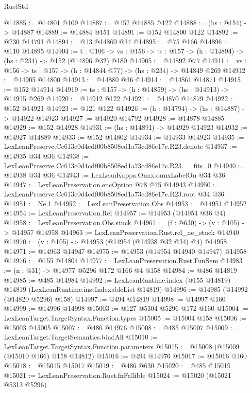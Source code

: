 \begin{lexlean}{RustStd}
\begin{coremodule}
@14885 := @14801 @109
@14887 := @152 @14885 @122
@14888 := (hs : @154) -> @14887
@14889 := @14884 @151
@14891 := @152 @14800 @122
@14892 := @230 @14791
@14894 := @13 @14860 @34
@14895 := @75 @166
@14896 := @110 @14895
@14904 := {t : @106} ->
  {vs : @156} -> {ts : @157} -> (h : @14894) -> (hs : @234) -> @152 (@14896 @32) @180
@14905 := @14892 @77
@14911 := {vs : @156} -> {ts : @157} -> (h : @14844 @77) -> (hs : @234) -> @14849 @269
@14912 := @14905 @14800
@14913 := @14880 @36
@14914 := @14861 @14871
@14915 := @152 @14914
@14919 := {ts : @157} -> (h : @14859) -> (hs : @14913) -> @14915 @269
@14920 := @14912 @122
@14921 := @14870 @14879
@14922 := @152 @14921
@14923 := @121 @122
@14926 := (h : @14794) -> (hs : @14887) -> @14922 @14923
@14927 := @14920 @14792
@14928 := @14878 @14885
@14929 := @152 @14928
@14931 := (hs : @14891) -> @14929 @14923
@14932 := @14927 @14889
@14933 := @152 @14802
@14934 := @14933 @14923
@14935 := LexLeanPreserve.Cc613c0d4cdf00b8508ed1a73cd86e17c.R23.denote
@14937 := @14935 @34 @36
@14938 := LexLeanPreserve.Cc613c0d4cdf00b8508ed1a73cd86e17c.R23.__fits_0
@14940 := @14938 @34 @36
@14943 := LexLeanKappa.Onnx.onnxLabelOn @34 @36
@14947 := LexLeanPreservation.encOption @78 @75 @14943
@14950 := LexLeanPreserve.Cc613c0d4cdf00b8508ed1a73cd86e17c.R23.root @34 @36
@14951 := Ne.{1}
@14952 := LexLeanPreservation.Obs
@14953 := @14951 @14952
@14954 := LexLeanPreservation.Rel
@14957 := @14953 (@14954 @36 @4)
@14958 := LexLeanPreservation.Obs.stuck
@14961 := (f : @630) -> (v : @105) -> @14957 @14958
@14963 := LexLeanPreservation.Rust.rel_ne_stuck @14940
@14970 := (v : @105) -> @14953 (@14954 (@14938 @32 @34) @4) @14958
@14971 := @14963 @14947
@14975 := @14953 (@14954 @14940 @14947) @14958
@14976 := @155 @14804
@14977 := LexLeanPreservation.Rust.FunSem
@14983 := (n : @31) -> @14977 @5296 @172 @166 @4 @158
@14984 := @486 @14819
@14985 := @485 @14984
@14992 := LexLeanRuntime.index (@155 @14819) @14819 (LexLeanRuntime.instIndexableList @14819)
@14996 := @14985 (@14992 (@14820 @5296) @158)
@14997 := @494 @14819
@14998 := @14997 @160
@14999 := @14996 @14998
@15003 := @127 @5304 @5296 @172 @160
@15004 := LexLeanTarget.TargetSyntax.Function.types
@15005 := @15004 @158
@15006 := @15003 @15005
@15007 := @486 @14976
@15008 := @485 @15007
@15009 := LexLeanTarget.TargetSemantics.bindAll
@15010 := LexLeanTarget.TargetSyntax.Function.parameters
@15015 := @15008 (@15009 (@15010 @166) @158 @14812)
@15016 := @494 @14976
@15017 := @15016 @160
@15018 := @15015 @15017
@15019 := @486 @630
@15020 := @485 @15019
@15021 := LexLeanPreservation.Rust.fnFallible
@15024 := @15020 (@15021 @5313 @5296)

\end{coremodule}
\end{lexlean}
